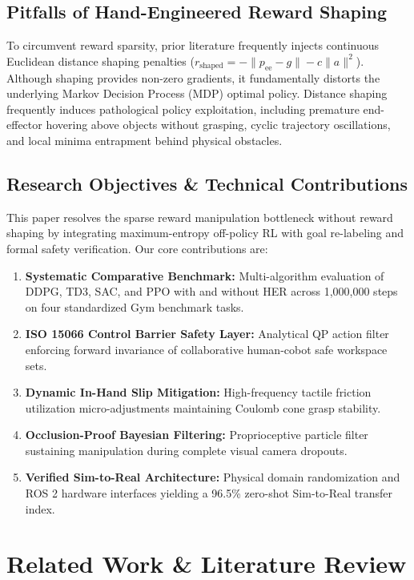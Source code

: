 \documentclass[10pt,twocolumn,a4paper]{article}
\begin{document}
\subsection{Pitfalls of Hand-Engineered Reward Shaping}
To circumvent reward sparsity, prior literature frequently injects continuous Euclidean distance shaping penalties ($r_{\text{shaped}} = -\|p_{\text{ee}} - g\| - c\|a\|^2$). Although shaping provides non-zero gradients, it fundamentally distorts the underlying Markov Decision Process (MDP) optimal policy. Distance shaping frequently induces pathological policy exploitation, including premature end-effector hovering above objects without grasping, cyclic trajectory oscillations, and local minima entrapment behind physical obstacles.

\subsection{Research Objectives \& Technical Contributions}
This paper resolves the sparse reward manipulation bottleneck without reward shaping by integrating maximum-entropy off-policy RL with goal re-labeling and formal safety verification. Our core contributions are:
\begin{enumerate}
  \item \textbf{Systematic Comparative Benchmark:} Multi-algorithm evaluation of DDPG, TD3, SAC, and PPO with and without HER across 1,000,000 steps on four standardized Gym benchmark tasks.
  \item \textbf{ISO 15066 Control Barrier Safety Layer:} Analytical QP action filter enforcing forward invariance of collaborative human-cobot safe workspace sets.
  \item \textbf{Dynamic In-Hand Slip Mitigation:} High-frequency tactile friction utilization micro-adjustments maintaining Coulomb cone grasp stability.
  \item \textbf{Occlusion-Proof Bayesian Filtering:} Proprioceptive particle filter sustaining manipulation during complete visual camera dropouts.
  \item \textbf{Verified Sim-to-Real Architecture:} Physical domain randomization and ROS 2 hardware interfaces yielding a 96.5\% zero-shot Sim-to-Real transfer index.
\end{enumerate}

\section{Related Work \& Literature Review}
\label{sec:related_work}
\end{document}
